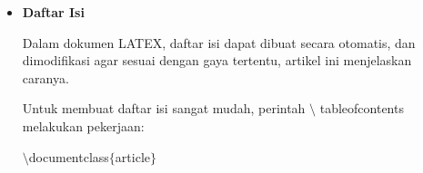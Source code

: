 \begin{itemize}
nyt\hspace*{0.5in}\hspace*{0.5in}\hspace*{0.5in}sort by name, year, title\par

nyvt\hspace*{0.5in}\hspace*{0.5in}\hspace*{0.5in}sort by name, year, volume, title\par

anyt\hspace*{0.5in}\hspace*{0.5in}\hspace*{0.5in}sort by alphabetic label, name, year, title\par

anyvt\hspace*{0.5in}\hspace*{0.5in}\hspace*{0.5in}sort by alphabetic label, name, year, volume, title\par

ydtn\hspace*{0.5in}\hspace*{0.5in}\hspace*{0.5in}sort by year (descending), name, title\par

none\hspace*{0.5in}\hspace*{0.5in}\hspace*{0.5in}entries are processed in citation order\par

\vspace{\baselineskip}
\vspace{12pt}
	\item {\fontsize{14pt}{14pt}\selectfont \textbf{Daftar Isi}}\par
\vspace{\baselineskip}
Dalam dokumen LATEX, daftar isi dapat dibuat secara otomatis, dan dimodifikasi agar sesuai dengan gaya tertentu, artikel ini menjelaskan caranya.\par

Untuk membuat daftar isi sangat mudah, perintah $\setminus$ tableofcontents melakukan pekerjaan:\par

\hspace*{0.5in}$\setminus$documentclass$ \{ $article$ \} $\par


\end{itemize}
